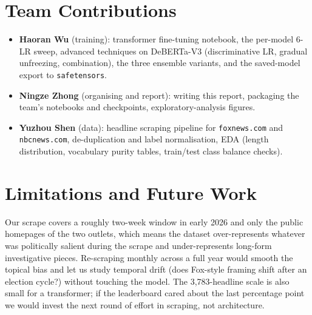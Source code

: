 \documentclass[10pt]{article}
\begin{document}
\section{Team Contributions}
\begin{itemize}
\item \textbf{Haoran Wu} (training): transformer fine-tuning notebook, the per-model 6-LR sweep, advanced techniques on DeBERTa-V3 (discriminative LR, gradual unfreezing, combination), the three ensemble variants, and the saved-model export to \texttt{safetensors}.
\item \textbf{Ningze Zhong} (organising and report): writing this report, packaging the team's notebooks and checkpoints, exploratory-analysis figures.
\item \textbf{Yuzhou Shen} (data): headline scraping pipeline for \texttt{foxnews.com} and \texttt{nbcnews.com}, de-duplication and label normalisation, EDA (length distribution, vocabulary purity tables, train/test class balance checks).
\end{itemize}


\section{Limitations and Future Work}

Our scrape covers a roughly two-week window in early 2026 and only the public homepages of the two outlets, which means the dataset over-represents whatever was politically salient during the scrape and under-represents long-form investigative pieces. Re-scraping monthly across a full year would smooth the topical bias and let us study temporal drift (does Fox-style framing shift after an election cycle?) without touching the model. The 3{,}783-headline scale is also small for a transformer; if the leaderboard cared about the last percentage point we would invest the next round of effort in scraping, not architecture.
\end{document}
